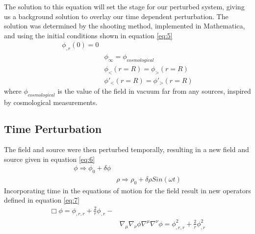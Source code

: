 \documentclass[12pt,a4paper]{article} %
\begin{document}
The solution to this equation will set the stage for our perturbed system, giving us a background solution to overlay our time dependent perturbation. The solution was determined by the shooting method, implemented in Mathematica, and using the initial conditions shown in equation \ref{eq:5}
\begin{equation}\label{eq:5}
\begin{split}
\phi_{,r}(0) = 0 \\
&\phi_{\infty} = \phi_{cosmological}\\
& \phi_{<}(r=R) = \phi_{>}(r=R)\\
&\phi'_{<}(r=R) = \phi'_{>}(r=R)
\end{split}
\end{equation}
where $\phi_{cosmological}$ is the value of the field in vacuum far from any sources, inspired by cosmological measurements. 
\subsection{Time Perturbation}

The field and source were then perturbed temporally, resulting in a new field and source given in equation \ref{eq:6}
\begin{equation}\label{eq:6}
\begin{split}
\phi \Rightarrow \phi_0 + \delta\phi \\
&\rho \Rightarrow \rho_0 + \delta \rho Sin(\omega t)
\end{split}
\end{equation}
Incorporating time in the equations of motion for the field result in new operators defined in equation \ref{eq:7}
\begin{equation}\label{eq:7}
\begin{split}
\Box \phi = \phi_{,r,r} + \frac{2}{r}\phi_{,r} -  \\
& \nabla_{\mu}\nabla_{\nu}\phi\nabla^{\mu}\nabla^{\nu}\phi = \phi_{,r,r}^2 + \frac{2}{r} \phi_{,r}^2
\end{split}
\end{equation}

\end{document}

